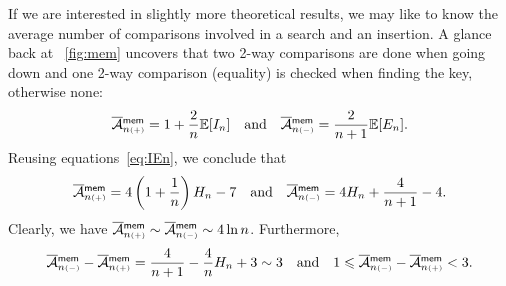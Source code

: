 If we are interested in slightly more theoretical results, we may like
to know the average number of comparisons involved in a search and an
insertion. A glance back at \fig~\vref{fig:mem} uncovers that two
2-way comparisons are done when going down and one 2-way comparison
(equality) is checked when finding the key, otherwise none:
\begin{equation}
\OM{\fun{mem}}{n{\scriptscriptstyle(+)}}
  = 1 + \frac{2}{n}\Expected{I_n}
\quad\text{and}\quad
\OM{\fun{mem}}{n{\scriptscriptstyle(-)}}
  = \frac{2}{n+1}\Expected{E_n}.
\label{eq:Mmem_cmp1}
\end{equation}
Reusing equations~\eqref{eq:IEn}, we conclude that
\begin{equation}
\OM{\fun{mem}}{n{\scriptscriptstyle(+)}}
  = 4\left(1+\frac{1}{n}\right)H_n - 7
\quad\text{and}\quad
\OM{\fun{mem}}{n{\scriptscriptstyle(-)}}
  = 4H_n + \frac{4}{n+1} - 4.
\index{mem@$\OM{\fun{mem}}{n{\scriptscriptstyle(-)}}$}
\index{mem@$\OM{\fun{mem}}{n{\scriptscriptstyle(+)}}$}
\label{eq:Mmem_cmp2}
\end{equation}
Clearly, we have \(\OM{\fun{mem}}{n{\scriptscriptstyle(+)}} \sim
\OM{\fun{mem}}{n{\scriptscriptstyle(-)}} \sim 4\ln n\). Furthermore,
\begin{equation*}
\OM{\fun{mem}}{n{\scriptscriptstyle (-)}} -
\OM{\fun{mem}}{n{\scriptscriptstyle (+)}} = 
\frac{4}{n+1} - \frac{4}{n}H_n + 3 \sim 3
\quad\text{and}\quad
1 \leqslant \OM{\fun{mem}}{n{\scriptscriptstyle (-)}} -
\OM{\fun{mem}}{n{\scriptscriptstyle (+)}} < 3.
\end{equation*}

